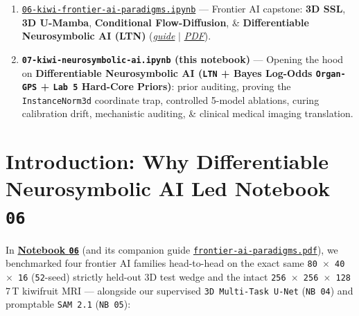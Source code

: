 \documentclass[10pt,a4paper]{article}
\newcommand{\ghblob}{https://github.com/arvidl/BMED365-2027/blob/main}
\begin{document}
\begin{seqbox}
\begin{enumerate}[start=0, itemsep=1.5pt, topsep=1pt, font=\footnotesize]
    \item \href{\ghblob/Lab4-Comp-Imag/Kiwi-challenge/notebooks/06-kiwi-frontier-ai-paradigms.ipynb}{\texttt{06-kiwi-frontier-ai-paradigms.ipynb}} --- Frontier AI capstone: \textbf{3D SSL}, \textbf{3D U-Mamba}, \textbf{Conditional Flow-Diffusion}, \& \textbf{Differentiable Neurosymbolic AI (LTN)} (\href{\ghblob/Lab4-Comp-Imag/Kiwi-challenge/docs/frontier-ai-paradigms.md}{\textit{guide}} $|$ \href{\ghblob/Lab4-Comp-Imag/Kiwi-challenge/docs/frontier-ai-paradigms.pdf}{\textit{PDF}}).
    \item \textbf{\texttt{07-kiwi-neurosymbolic-ai.ipynb} (this notebook)} --- Opening the hood on \textbf{Differentiable Neurosymbolic AI (\texttt{LTN} + Bayes Log-Odds \texttt{Organ-GPS} + \texttt{Lab 5} Hard-Core Priors)}: prior auditing, proving the \texttt{InstanceNorm3d} coordinate trap, controlled 5-model ablations, curing calibration drift, mechanistic auditing, \& clinical medical imaging translation.
\end{enumerate}
\end{seqbox}

\section*{Introduction: Why Differentiable Neurosymbolic AI Led Notebook \texttt{06}}

In \href{\ghblob/Lab4-Comp-Imag/Kiwi-challenge/notebooks/06-kiwi-frontier-ai-paradigms.ipynb}{\textbf{Notebook \texttt{06}}} (and its companion guide \href{\ghblob/Lab4-Comp-Imag/Kiwi-challenge/docs/frontier-ai-paradigms.pdf}{\texttt{frontier-ai-paradigms.pdf}}), we benchmarked four frontier AI families head-to-head on the exact same \texttt{80 $\times$ 40 $\times$ 16} (\texttt{52}-seed) strictly held-out 3D test wedge and the intact \texttt{256 $\times$ 256 $\times$ 128} 7\,T kiwifruit MRI --- alongside our supervised \texttt{3D Multi-Task U-Net} (\texttt{NB 04}) and promptable \texttt{SAM 2.1} (\texttt{NB 05}):
\end{document}
